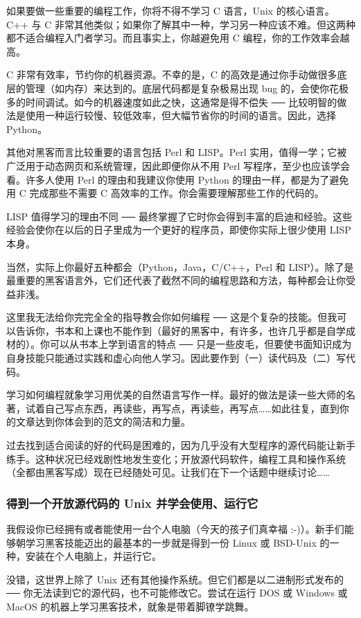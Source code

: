 如果要做一些重要的编程工作，你将不得不学习 C 语言，Unix 的核心语言。C++ 与 C 非常其他类似；如果你了解其中一种，学习另一种应该不难。但这两种都不适合编程入门者学习。而且事实上，你越避免用 C 编程，你的工作效率会越高。

C 非常有效率，节约你的机器资源。不幸的是，C 的高效是通过你手动做很多底层的管理（如内存）来达到的。底层代码都是复杂极易出现 bug 的，会使你花极多的时间调试。如今的机器速度如此之快，这通常是得不偿失 ── 比较明智的做法是使用一种运行较慢、较低效率，但大幅节省你的时间的语言。因此，选择 Python。

其他对黑客而言比较重要的语言包括 Perl 和 LISP。Perl 实用，值得一学；它被广泛用于动态网页和系统管理，因此即便你从不用 Perl 写程序，至少也应该学会看。许多人使用 Perl 的理由和我建议你使用 Python 的理由一样，都是为了避免用 C 完成那些不需要 C 高效率的工作。你会需要理解那些工作的代码的。

LISP 值得学习的理由不同 ── 最终掌握了它时你会得到丰富的启迪和经验。这些经验会使你在以后的日子里成为一个更好的程序员，即使你实际上很少使用 LISP 本身。

当然，实际上你最好五种都会（Python，Java，C/C++，Perl 和 LISP）。除了是最重要的黑客语言外，它们还代表了截然不同的编程思路和方法，每种都会让你受益非浅。

这里我无法给你完完全全的指导教会你如何编程 ── 这是个复杂的技能。但我可以告诉你，书本和上课也不能作到（最好的黑客中，有许多，也许几乎都是自学成材的）。你可以从书本上学到语言的特点 ── 只是一些皮毛，但要使书面知识成为自身技能只能通过实践和虚心向他人学习。因此要作到（一）读代码及（二）写代码。

学习如何编程就象学习用优美的自然语言写作一样。最好的做法是读一些大师的名著，试着自己写点东西，再读些，再写点，再读些，再写点……如此往复，直到你的文章达到你体会到的范文的简洁和力量。

过去找到适合阅读的好的代码是困难的，因为几乎没有大型程序的源代码能让新手练手。这种状况已经戏剧性地发生变化；开放源代码软件，编程工具和操作系统（全都由黑客写成）现在已经随处可见。让我们在下一个话题中继续讨论……



\subsubsection{得到一个开放源代码的 Unix 并学会使用、运行它}
我假设你已经拥有或者能使用一台个人电脑（今天的孩子们真幸福 :-)）。新手们能够朝学习黑客技能迈出的最基本的一步就是得到一份 Linux 或 BSD-Unix 的一种，安装在个人电脑上，并运行它。

没错，这世界上除了 Unix 还有其他操作系统。但它们都是以二进制形式发布的 ── 你无法读到它的源代码，也不可能修改它。尝试在运行 DOS 或 Windows 或 MacOS 的机器上学习黑客技术，就象是带着脚镣学跳舞。

